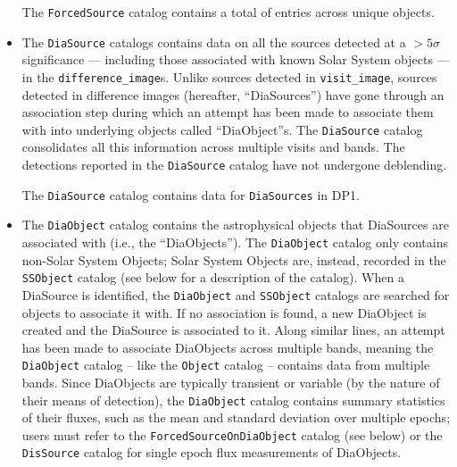 \begin{itemize}
The \texttt{ForcedSource} catalog contains a total of \nforcedsources entries across \nforcedobjects unique objects.


\item The \texttt{DiaSource} catalogs contains data on all the sources detected at a $>5\sigma$ significance --- including those associated with known Solar System objects --- in the \texttt{difference\_image}s. 
Unlike sources detected in \texttt{visit\_image}, sources detected in difference images (hereafter, ``DiaSources'') have gone through an association step during which an attempt has been made to associate them with into underlying objects called ``DiaObject''s. The \texttt{DiaSource} catalog consolidates all this information across multiple visits and bands. The detections reported in the \texttt{DiaSource} catalog have not undergone deblending.

The \texttt{DiaSource} catalog contains data for \ndiasources \texttt{DiaSources} in DP1.


\item The \texttt{DiaObject} catalog contains the astrophysical objects that DiaSources are associated with (i.e., the ``DiaObjects'').
The \texttt{DiaObject} catalog only contains non-Solar System Objects; Solar System Objects are, instead, recorded in the \texttt{SSObject} catalog (see below for a description of the  catalog).
When a DiaSource is identified, the \texttt{DiaObject} and \texttt{SSObject} catalogs are searched for objects to associate it with.
If no association is found, a new DiaObject is created and the DiaSource is associated to it.
Along similar lines, an attempt has been made to associate DiaObjects across multiple bands, meaning the \texttt{DiaObject} catalog -- like the \texttt{Object} catalog -- contains data from multiple bands.
Since DiaObjects are typically transient or variable (by the nature of their means of detection), the \texttt{DiaObject} catalog contains summary statistics of their fluxes, such as the mean and standard deviation over multiple epochs; users must refer to the \texttt{ForcedSourceOnDiaObject} catalog (see below) or the \texttt{DisSource} catalog for single epoch flux measurements of DiaObjects.


\end{itemize}
